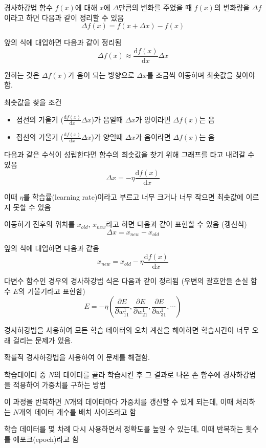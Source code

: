 \documentclass[10pt,t]{beamer}
\begin{document}
\begin{frame}{경사하강법}
    함수 $f(x)$에 대해 $x$에 $\Delta$만큼의 변화를 주었을 때 $f(x)$의 변화량을 $\Delta f$이라고 하면 다음과 같이 정리할 수 있음
    \[\Delta f(x) = f(x+\Delta x)-f(x) \]

    앞의 식에 대입하면 다음과 같이 정리됨
    \[\Delta f(x) \approx \frac{\text{d}f(x)}{\text{d}x} \Delta x \]

    원하는 것은 $\Delta f(x)$가 음이 되는 방향으로 $\Delta x$를 조금씩 이동하며 최솟값을 찾아야 함.
    
    \pagebreak

    최솟값을 찾을 조건
    \begin{itemize}
        \item 접선의 기울기 ($\frac{\text{d}f(x)}{\text{d}x} \Delta x$)가 음일때 $\Delta x$가 양이라면 $\Delta f(x)$는 음
        \item 접선의 기울기 ($\frac{\text{d}f(x)}{\text{d}x} \Delta x$)가 양일때 $\Delta x$가 음이라면 $\Delta f(x)$는 음
    \end{itemize}

    다음과 같은 수식이 성립한다면 함수의 최솟값을 찾기 위해 그래프를 타고 내려갈 수 있음
    \[\Delta x = -\eta\frac{\text{d}f(x)}{\text{d}x} \]

    이때  $\eta$를 학습률(learning rate)이라고 부르고 너무 크거나 너무 작으면 최솟값에 이르지 못할 수 있음

    \pagebreak

    이동하기 전후의 위치를 $x_{old}$, $x_{new}$라고 하면 다음과 같이 표현할 수 있음 (갱신식)
    \[\Delta x = x_{new}- x_{old}\]

    앞의 식에 대입하면 다음과 같음
    \[x_{new} = x_{old} -\eta\frac{\text{d}f(x)}{\text{d}x} \]

    다변수 함수인 경우의 경사하강법 식은 다음과 같이 정리됨 (우변의 괄호안을 손실 함수 $E$의 기울기라고 표현함)
    \[E = -\eta\left(\frac{\partial E}{\partial w_{11}^1} , \frac{\partial E}{\partial w_{21}^1}, \frac{\partial E}{\partial w_{31}^1}, \cdots \right)\]

    \pagebreak
    
    경사하강법을 사용하여 모든 학습 데이터의 오차 계산을 해야하면 학습시간이 너무 오래 걸리는 문제가 있음.
    
    확률적 경사하강법을 사용하여 이 문제를 해결함.

    학습데이터 중 $N$의 데이터를 골라 학습시킨 후 그 결과로 나온 손 함수에 경사하강법을 적용하여 가중치를 구하는 방법

    이 과정을 반복하면 $N$개의 데이터마다 가중치를 갱신할 수 있게 되는데, 이때 처리하는 $N$개의 데이터 개수를 배치 사이즈라고 함

    학습 데이터를 몇 차례 다시 사용하면서 정확도를 높일 수 있는데, 이때 반복하는 횟수를 에포크(epoch)라고 함
\end{frame}
\end{document}
